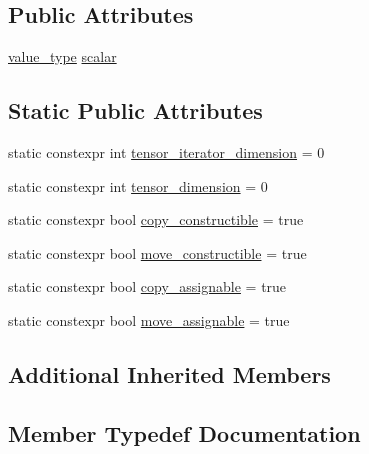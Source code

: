 \subsection*{Public Attributes}
\begin{DoxyCompactItemize}
\item 
\hyperlink{structBC_1_1tensors_1_1exprs_1_1Scalar__Constant_a132ee57f3d537e185f9937eec1359759}{value\+\_\+type} \hyperlink{structBC_1_1tensors_1_1exprs_1_1Scalar__Constant_a803d034d27533cb7c99dbba7d44b8215}{scalar}
\end{DoxyCompactItemize}
\subsection*{Static Public Attributes}
\begin{DoxyCompactItemize}
\item 
static constexpr int \hyperlink{structBC_1_1tensors_1_1exprs_1_1Scalar__Constant_a51b6300b3b89c7782b7f346f18504a56}{tensor\+\_\+iterator\+\_\+dimension} = 0
\item 
static constexpr int \hyperlink{structBC_1_1tensors_1_1exprs_1_1Scalar__Constant_a5a81f96b76d0729fc2b5a114bea3de4b}{tensor\+\_\+dimension} = 0
\item 
static constexpr bool \hyperlink{structBC_1_1tensors_1_1exprs_1_1Scalar__Constant_aff8b41ea968094d908b4ef13e3f5784f}{copy\+\_\+constructible} = true
\item 
static constexpr bool \hyperlink{structBC_1_1tensors_1_1exprs_1_1Scalar__Constant_a5c71bda5c16da054ea0f8a9e50d325a2}{move\+\_\+constructible} = true
\item 
static constexpr bool \hyperlink{structBC_1_1tensors_1_1exprs_1_1Scalar__Constant_a22d3dec437bd51ac3d90098b1f514453}{copy\+\_\+assignable} = true
\item 
static constexpr bool \hyperlink{structBC_1_1tensors_1_1exprs_1_1Scalar__Constant_a1079c90778cb91cb909f41244c6e82d7}{move\+\_\+assignable} = true
\end{DoxyCompactItemize}
\subsection*{Additional Inherited Members}


\subsection{Member Typedef Documentation}

